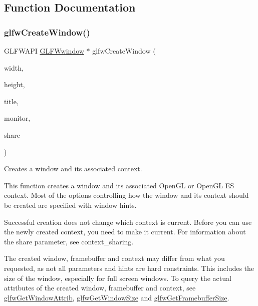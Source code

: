 \subsection{Function Documentation}
\mbox{\label{group__window_gaaccd00fafe81e2db94e8cdf55721e055}} 
\subsubsection{\texorpdfstring{glfw\+Create\+Window()}{glfwCreateWindow()}}
{\footnotesize\ttfamily G\+L\+F\+W\+A\+PI \hyperlink{group__window_ga3c96d80d363e67d13a41b5d1821f3242}{G\+L\+F\+Wwindow} $\ast$ glfw\+Create\+Window (\begin{DoxyParamCaption}\item[{int}]{width,  }\item[{int}]{height,  }\item[{const char $\ast$}]{title,  }\item[{\hyperlink{group__monitor_ga8d9efd1cde9426692c73fe40437d0ae3}{G\+L\+F\+Wmonitor} $\ast$}]{monitor,  }\item[{\hyperlink{group__window_ga3c96d80d363e67d13a41b5d1821f3242}{G\+L\+F\+Wwindow} $\ast$}]{share }\end{DoxyParamCaption})}



Creates a window and its associated context. 

This function creates a window and its associated Open\+GL or Open\+GL ES context. Most of the options controlling how the window and its context should be created are specified with window hints.

Successful creation does not change which context is current. Before you can use the newly created context, you need to make it current. For information about the {\ttfamily share} parameter, see context\+\_\+sharing.

The created window, framebuffer and context may differ from what you requested, as not all parameters and hints are hard constraints. This includes the size of the window, especially for full screen windows. To query the actual attributes of the created window, framebuffer and context, see \hyperlink{group__window_ga1bb0c7e100418e284dbb800789c63d40}{glfw\+Get\+Window\+Attrib}, \hyperlink{group__window_ga7feb769ebb3f3d21579b5a3fb07be76e}{glfw\+Get\+Window\+Size} and \hyperlink{group__window_gaf7d17f3534b4b6dc9a6f905e3a240b7e}{glfw\+Get\+Framebuffer\+Size}.

